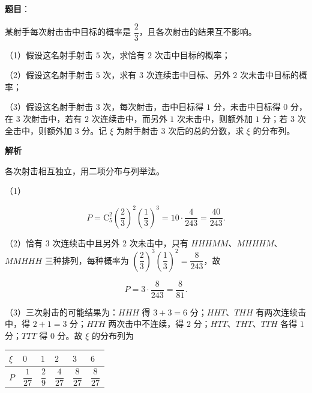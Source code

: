 \begin{answer}

\textbf{题目}：

某射手每次射击击中目标的概率是 $\dfrac23$，且各次射击的结果互不影响。

（1）假设这名射手射击 $5$ 次，求恰有 $2$ 次击中目标的概率；

（2）假设这名射手射击 $5$ 次，求有 $3$ 次连续击中目标、另外 $2$ 次未击中目标的概率；

（3）假设这名射手射击 $3$ 次，每次射击，击中目标得 $1$ 分，未击中目标得 $0$ 分，在 $3$ 次射击中，若有 $2$ 次连续击中，而另外 $1$ 次未击中，则额外加 $1$ 分；若 $3$ 次全击中，则额外加 $3$ 分。记 $\xi$ 为射手射击 $3$ 次后的总的分数，求 $\xi$ 的分布列。

\textbf{解析}

各次射击相互独立，用二项分布与列举法。

（1）

\nopagebreak[4]
\[P=\mathrm C_5^2\left(\frac23\right)^2\left(\frac13\right)^3
=10\cdot\frac4{243}=\frac{40}{243}.\]

（2）恰有 $3$ 次连续击中且另外 $2$ 次未击中，只有 $HHHMM$、$MHHHM$、$MMHHH$ 三种排列，每种概率为 $\left(\dfrac23\right)^3\left(\dfrac13\right)^2=\dfrac8{243}$，故

\nopagebreak[4]
\[P=3\cdot\frac8{243}=\frac8{81}.\]

（3）三次射击的可能结果为：$HHH$ 得 $3+3=6$ 分；$HHT$、$THH$ 有两次连续击中，得 $2+1=3$ 分；$HTH$ 两次击中不连续，得 $2$ 分；$HTT$、$THT$、$TTH$ 各得 $1$ 分；$TTT$ 得 $0$ 分。故 $\xi$ 的分布列为

\begin{center}
\begin{tabular}{llllll}
\toprule
$\xi$ & $0$ & $1$ & $2$ & $3$ & $6$ \\
\midrule
$P$ & $\dfrac1{27}$ & $\dfrac29$ & $\dfrac4{27}$ & $\dfrac8{27}$ & $\dfrac8{27}$ \\
\bottomrule
\end{tabular}
\end{center}


\end{answer}

